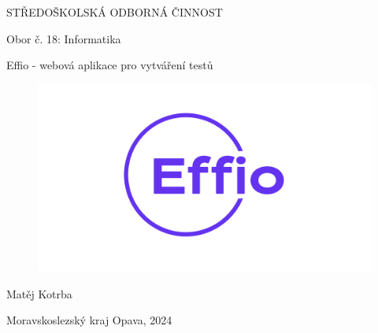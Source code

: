 \documentclass[12pt, a4paper,
openright
]{report}
\title{\mainTitle} %
\author{\authorName} %
\date{\publicationYear} %
\title{\nazevPrace} %
\author{\jmenoAutora} %
\date{\datumOdevzdani} %
\newcommand\city{Opava} %
\newcommand\district{Moravskoslezský kraj} %
\newcommand\specialization{Obor č. 18: Informatika} %
\newcommand\authorName{Matěj Kotrba}  %
\newcommand\publicationYear{2024} %
\newcommand\mainTitle{Effio - webová aplikace pro vytváření testů} %
\begin{document}
\pagestyle{empty}

\begin{titlepage}
    \bfseries{ %
        \begin{center}
            \LARGE{STŘEDOŠKOLSKÁ ODBORNÁ ČINNOST}

            \vspace{14pt}
            \large{ %
                \specialization
            } %

            \vspace{0.2 \textheight}

            \LARGE{ %
                \mainTitle
            }%

		\begin{figure}[h]
			\centering
			\includegraphics[width=0.8\linewidth]{image/effio.png} 
		\end{figure}

            \vspace{0.2\textheight}
        \end{center}
        
        \noindent\Large{\authorName} 

        \noindent\Large{\district {}  \city, \publicationYear} 
        
            
    } %
\end{titlepage}

\cleardoublepage
\end{document}
